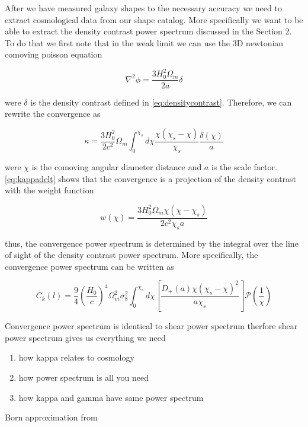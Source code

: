 After we have measured galaxy shapes to the necessary accuracy we need to extract cosmological data from our shape catalog. More specifically we want to be able to extract the density contrast power spectrum discussed in the Section 2. To do that we first note that in the weak limit we can use the 3D newtonian comoving poisson equation

\begin{equation}
    \nabla^2 \phi = \frac{3H_0 ^2\Omega_m }{2a} \delta
    \label{eq:poisson}
\end{equation}

were $\delta$ is the density contrast defined in \autoref{eq:densitycontrast}. Therefore, we can rewrite the convergence as

\begin{equation}
    \kappa = \frac{3H_0^2}{2c^2} \Omega_m \int_{0}^{\chi_s} d\chi  \frac{\chi (\chi_s-\chi)}{\chi_s} \frac{\delta(\chi)}{a}
    \label{eq:kappadelt}
\end{equation}

were $\chi$ is the comoving angular diameter distance and $a$ is the scale factor. \autoref{eq:kappadelt} shows that the convergence is a projection of the density contrast with the weight function 

\begin{equation}
    w(\chi) = \frac{3H_0^2 \Omega_m \chi (\chi - \chi_s)}{2 c^2 \chi_s a}
    \label{eq:weight}
\end{equation}

thus, the convergence power spectrum is determined by the integral over the line of sight of the density contrast power spectrum\cite{Hoekstra:2013gua,rachel_2018,Bartelmann:2016dvf}. More specifically, the convergence power spectrum can be written as 

\begin{equation}
    C_k(l) = \frac{9}{4} \left(\frac{H_0}{c}\right)^4\Omega_m^2 \sigma_8^2 \int^{\chi_s}_0 d \chi \left[\frac{D_+(a)\chi (\chi_s-\chi)^2}{a \chi_s}\right] \mathcal{P}\left(\frac{1}{\chi}\right)
    \label{eq:convergencespectrum}
\end{equation}


Convergence power spectrum is identical to shear power spectrum therfore shear power spectrum gives us everything we need

\begin{enumerate}
    \item how kappa relates to cosmology
    \item how power spectrum is all you need 
    \item how kappa and gamma have same power spectrum
\end{enumerate}
Born approximation from \cite{Bartelmann:2016dvf}
